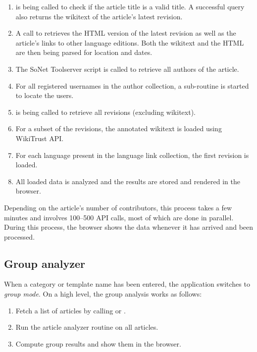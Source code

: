 \begin{enumerate}
	\item {} is being called to check if the article title is a valid title. 
	A successful query also returns the wikitext of the article's latest revision.
	\item A call to  retrieves the \ac{HTML} version of the latest revision as well as the article's links to other language editions. 
	Both the wikitext and the \ac{HTML} are then being parsed for location and dates.
	\item The SoNet Toolserver script is called to retrieve all authors of the article.
	\item For all registered usernames in the author collection, a sub-routine is started to locate the users. 
	\item {} is being called to retrieve all revisions (excluding wikitext). 
	\item For a subset of the revisions, the annotated wikitext is loaded using WikiTrust \ac{API}.
	\item For each language present in the language link collection, the first revision is loaded.
	\item All loaded data is analyzed and the results are stored and rendered in the browser.
\end{enumerate}

Depending on the article's number of contributors, this process takes a few minutes and involves 100--500 \ac{API} calls, most of which are done in parallel. 
During this process, the browser shows the data whenever it has arrived and been processed.

\subsection{Group analyzer}

When a category or template name has been entered, the application switches to \emph{group mode}.
On a high level, the group analysis works as follows:

\begin{enumerate}
    \item Fetch a list of articles by calling  or .
    \item Run the article analyzer routine on all articles.
    \item Compute group results and show them in the browser.
\end{enumerate}

